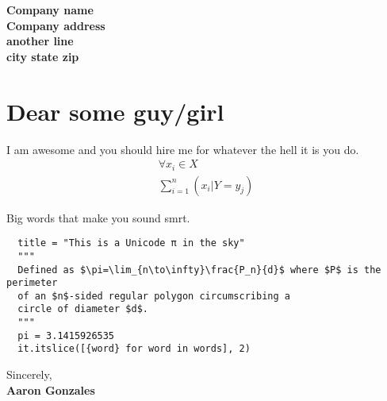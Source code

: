 \documentclass[12pt]{friggeri-cv-coverletter} %
\begin{document}

\textbf{Company name} \\
\textbf{Company address} \\
\textbf{another line} \\
\textbf{city state zip} \\

\section{Dear some guy/girl}

I am awesome and you should hire me for whatever the hell it is you do. 
\begin{align}
  \forall x_i \in X \\
  \sum_{i=1}^n \left(x_i | Y = y_j\right)
\end{align}
  
Big words that make you sound smrt.

\begin{verbatim}
  title = "This is a Unicode π in the sky"
  """
  Defined as $\pi=\lim_{n\to\infty}\frac{P_n}{d}$ where $P$ is the perimeter
  of an $n$-sided regular polygon circumscribing a
  circle of diameter $d$.
  """
  pi = 3.1415926535
  it.itslice([{word} for word in words], 2)
\end{verbatim}
Sincerely, \\
\textbf{Aaron Gonzales}

\end{document}
